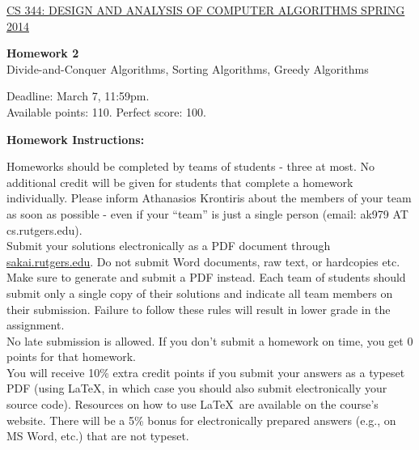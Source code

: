 \documentclass{article}
\begin{document}
\sloppy

\noindent \underline{CS 344: DESIGN AND ANALYSIS OF COMPUTER
  ALGORITHMS \hspace{1.6in} SPRING 2014}

\vspace{0.1in}

\begin{center}
{\bf {\large Homework 2}}\\
Divide-and-Conquer Algorithms, Sorting Algorithms, Greedy Algorithms\\
\end{center}

\vspace{0.1in}

\noindent Deadline: March 7, 11:59pm.\\ 
Available points: 110. Perfect score: 100.\\

\begin{center}
{\bf Homework Instructions:}
\end{center}

 Homeworks should be completed by teams of
students - three at most. No additional credit will be given for
students that complete a homework individually. Please inform
Athanasios Krontiris about the members of your team as soon as
possible - even if your ``team'' is just a single person (email: ak979
AT cs.rutgers.edu).\\

 Submit your solutions electronically
as a PDF document through \url{sakai.rutgers.edu}. Do not submit Word
documents, raw text, or hardcopies etc. Make sure to generate and
submit a PDF instead. Each team of students should submit only a
single copy of their solutions and indicate all team members on their
submission.  Failure to follow these rules will result in lower grade
in the assignment.\\

 No late submission is allowed. If
you don't submit a homework on time, you get 0 points for that
homework.\\

 You will receive 10\% extra
credit points if you submit your answers as a typeset PDF (using
\LaTeX, in which case you should also submit electronically your
source code). Resources on how to use \LaTeX\ are available on the
course's website. There will be a 5\% bonus for electronically
prepared answers (e.g., on MS Word, etc.) that are not typeset.\\
\end{document}
